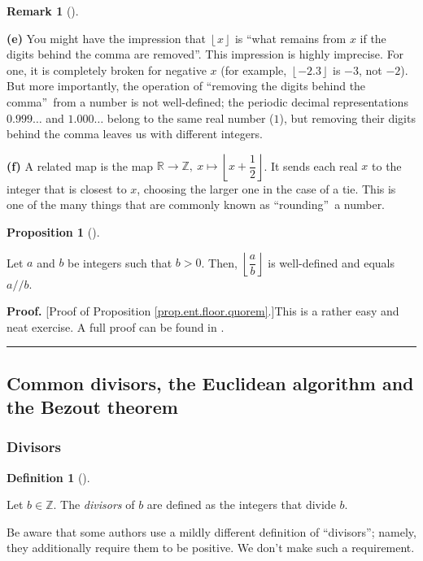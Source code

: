 \documentclass[numbers=enddot,12pt,final,onecolumn,notitlepage]{scrartcl}%
\newcounter{exer}
\numberwithin{exer}{subsection}
\theoremstyle{definition}
\newtheorem{prop}[theo]{Proposition}
\newenvironment{proposition}[1][]
{\begin{prop}[#1]\begin{leftbar}}
{\end{leftbar}\end{prop}}
\newtheorem{defi}[theo]{Definition}
\newenvironment{definition}[1][]
{\begin{defi}[#1]\begin{leftbar}}
{\end{leftbar}\end{defi}}
\newtheorem{remk}[theo]{Remark}
\newenvironment{remark}[1][]
{\begin{remk}[#1]\begin{leftbar}}
{\end{leftbar}\end{remk}}
\newenvironment{proof}[1][Proof]{\noindent\textbf{#1.} }{\ \rule{0.5em}{0.5em}}
\begin{document}
\begin{remark}
\textbf{(e)} You might have the impression that $\left\lfloor x\right\rfloor $
is \textquotedblleft what remains from $x$ if the digits behind the comma are
removed\textquotedblright. This impression is highly imprecise. For one, it is
completely broken for negative $x$ (for example, $\left\lfloor
-2.3\right\rfloor $ is $-3$, not $-2$). But more importantly, the operation of
\textquotedblleft removing the digits behind the comma\textquotedblright\ from
a number is not well-defined; the periodic decimal representations
$0.999\ldots$ and $1.000\ldots$ belong to the same real number ($1$), but
removing their digits behind the comma leaves us with different integers.

\textbf{(f)} A related map is the map $\mathbb{R}\rightarrow\mathbb{Z}%
,\ x\mapsto\left\lfloor x+\dfrac{1}{2}\right\rfloor $. It sends each real $x$
to the integer that is closest to $x$, choosing the larger one in the case of
a tie. This is one of the many things that are commonly known as
\textquotedblleft rounding\textquotedblright\ a number.
\end{remark}

\begin{proposition}
\label{prop.ent.floor.quorem}Let $a$ and $b$ be integers such that $b>0$.
Then, $\left\lfloor \dfrac{a}{b}\right\rfloor $ is well-defined and equals
$a//b$.
\end{proposition}

\begin{proof}
[Proof of Proposition \ref{prop.ent.floor.quorem}.]This is a rather easy and
neat exercise. A full proof can be found in \cite[proof of Proposition
1.1.3]{floor}.
\end{proof}

\subsection{Common divisors, the Euclidean algorithm and the Bezout theorem}

\subsubsection{Divisors}

\begin{definition}
Let $b\in\mathbb{Z}$. The \textit{divisors} of $b$ are defined as the integers
that divide $b$.
\end{definition}

Be aware that some authors use a mildly different definition of
\textquotedblleft divisors\textquotedblright; namely, they additionally
require them to be positive. We don't make such a requirement.
\end{document}
